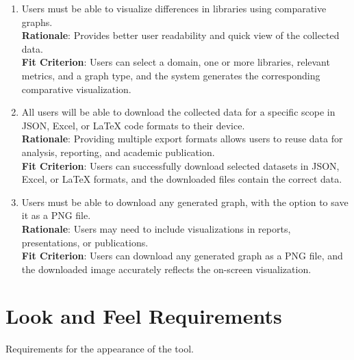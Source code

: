 \documentclass[12pt]{article}
\begin{document}
\begin{enumerate}[label=FR\arabic*]
  \item Users must be able to visualize differences in libraries using comparative graphs.
  \\ \textbf{Rationale}: Provides better user readability and quick view of the collected data.
  \\ \textbf{Fit Criterion}: Users can select a domain, one or more libraries, relevant metrics, and a graph type, and the system generates the corresponding comparative visualization.
  \item All users will be able to download the collected data for a specific scope in JSON, Excel, or LaTeX code formats to their device.
  \\ \textbf{Rationale}: Providing multiple export formats allows users to reuse data for analysis, reporting, and academic publication.
  \\ \textbf{Fit Criterion}: Users can successfully download selected datasets in JSON, Excel, or LaTeX formats, and the downloaded files contain the correct data.
  \item Users must be able to download any generated graph, with the option to save it as a PNG file.
  \\ \textbf{Rationale}: Users may need to include visualizations in reports, presentations, or publications.
  \\ \textbf{Fit Criterion}: Users can download any generated graph as a PNG file, and the downloaded image accurately reflects the on-screen visualization.
\end{enumerate}

\section{Look and Feel Requirements}
Requirements for the appearance of the tool.
\end{document}
